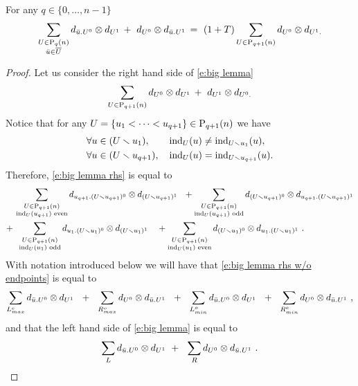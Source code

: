 \begin{lemma} \label{l:big lemma}  
	For any $q \in \{0, \dots, n-1\}$
	\begin{equation} \label{e:big lemma}
	\sum_{\substack{U \in \P_{q}(n) \\ \bu \in \overline{U}}} d_{\bu.U^0} \otimes d_{U^1}\, +\ d_{U^0} \otimes d_{\bu.U^1}\, = \
	(1+T) \sum_{U \in \P_{q+1}(n)} d_{U^0} \otimes d_{U^1.}
	\end{equation}
\end{lemma}

\begin{proof}
	Let us consider the right hand side of \eqref{e:big lemma}
	\begin{equation} \label{e:big lemma rhs}
	\sum_{U \in \P_{q+1}(n)} d_{U^0} \otimes d_{U^1}\, +\ d_{U^1} \otimes d_{U^0.}
	\end{equation}
	Notice that for any $U = \{u_1 < \cdots < u_{q+1}\} \in \P_{q+1}(n)$ we have
	\begin{align*}
	& \forall u \in (U \sm u_1), \qquad \ind_{U}(u) \neq \ind_{U \sm u_1}(u), \\
	& \forall u \in (U \sm u_{q+1}), \quad \ind_{U}(u) = \ind_{U \sm u_{q+1}}(u).
	\end{align*}
	Therefore, \eqref{e:big lemma rhs} is equal to
	\begin{equation} \label{e:big lemma rhs w/o endpoints}
	\begin{split}
	&\, \sum_{\substack{U \in \P_{q+1}(n) \\ \ind_U(u_{q+1}) \text{ even}}}
	d_{u_{q+1}.(U \sm u_{q+1})^0} \otimes d_{(U \sm u_{q+1})^1}\ \ + 
	\sum_{\substack{U \in \P_{q+1}(n) \\ \ind_U(u_{q+1}) \text{ odd}}}
	d_{(U \sm u_{q+1})^0} \otimes d_{u_{q+1}.(U \sm u_{q+1})^1} \\ +
	&\ \,\sum_{\substack{U \in \P_{q+1}(n) \\ \ind_U(u_1) \text{ odd}}} d_{u_1.(U \sm u_1)^0} \otimes d_{(U\sm u_1)^1} \quad +
	\sum_{\substack{U \in \P_{q+1}(n) \\ \ind_U(u_1) \text{ even}}} d_{(U \sm u_1)^0} \otimes d_{u_1.(U\sm u_1)^1} \ .
	\end{split}
	\end{equation}
	With notation introduced below we will have that \eqref{e:big lemma rhs w/o endpoints} is equal to
	\begin{equation*}
	\sum_{{L}_{max}^{e}} d_{\bu.U^0} \otimes d_{U^1}\ \ +\ \ 
	\sum_{{R}_{max}^{o}} d_{U^0} \otimes d_{\bu.U^1}\ \ +\ \ 
	\sum_{{L}_{min}^{o}} d_{\bu.U^0} \otimes d_{U^1}\ \ +\ \ 
	\sum_{{R}_{min}^{e}} d_{U^0} \otimes d_{\bu.U^1} \ ,
	\end{equation*}
	and that the left hand side of \eqref{e:big lemma} is equal to
	\begin{equation*}
	\sum_{L} d_{\bu.U^0} \otimes d_{U^1}\ +\ \ 
	\sum_{R} d_{U^0} \otimes d_{\bu.U^1} \ .
	\end{equation*}
	

\end{proof}
